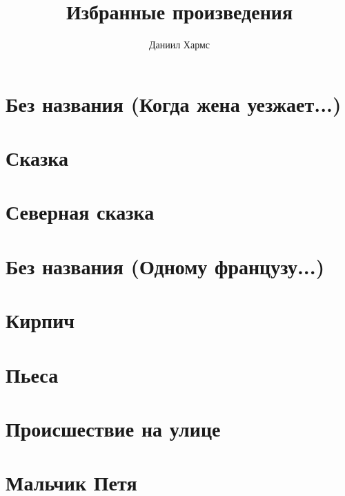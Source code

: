 \documentclass[a4paper,12pt]{article}
\title{Избранные произведения}
\author{Даниил Хармс}
\date{}
\begin{document}
\maketitle

\section{Без названия (Когда жена уезжает...)}


\section{Сказка}


\section{Северная сказка}


\section{Без названия (Одному французу...)}


\section{Кирпич}


\section{Пьеса}


\section{Происшествие на улице}


\section{Мальчик Петя}

\end{document}
